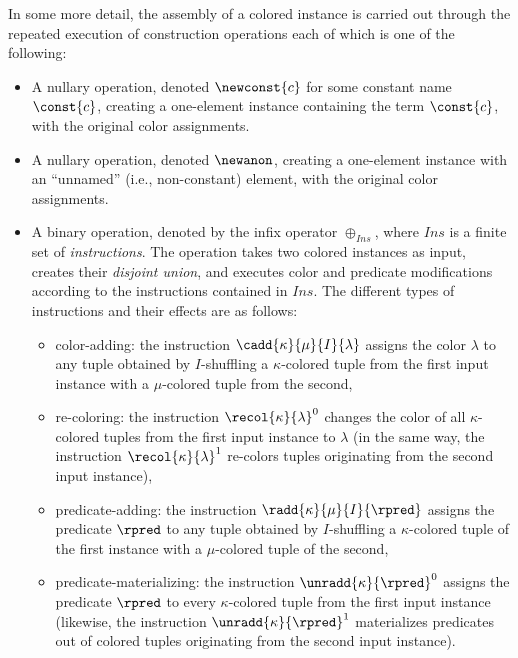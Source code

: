In some more detail, the assembly of a colored instance is carried out through the repeated execution of construction operations each of which is one of the following:
\begin{itemize}
	\item A nullary operation, denoted $\newconst{c}$ for some constant name $\const{c}$, creating a one-element instance containing the term $\const{c}$, with the original color assignments.
	\item A nullary operation, denoted $\newanon$,  creating a one-element instance with an ``unnamed'' (i.e., non-constant) element, with the original color assignments.
	\item A binary operation, denoted by the infix operator $\oplus_{\mathit{Ins}}$, where $\mathit{Ins}$ is a finite set of \emph{instructions}.
	The operation takes two colored instances as input, creates their \emph{disjoint union}, and executes color and predicate modifications according to the instructions contained in $\mathit{Ins}$. The different types of instructions and their effects are as follows:
	\begin{itemize}
		\item color-adding: the instruction $\cadd{\kappa}{\mu}{I}{\lambda}$ assigns the color $\lambda$ to any tuple obtained by $I$-shuffling a $\kappa$-colored tuple from the first input instance with a $\mu$-colored tuple from the second,   
		\item re-coloring: the instruction $\recol{\kappa}{\lambda}^0$ changes the color of all $\kappa$-colored tuples from the first input instance to $\lambda$ (in the same way, the instruction $\recol{\kappa}{\lambda}^1$ re-colors tuples originating from the second input instance),		
		\item predicate-adding: the instruction $\radd{\kappa}{\mu}{I}{\rpred}$ assigns the predicate $\rpred$ to any tuple obtained by $I$-shuffling a $\kappa$-colored tuple of the first instance with a $\mu$-colored tuple of the second,
		\item predicate-materializing: the instruction $\unradd{\kappa}{\rpred}^0$ assigns the predicate $\rpred$ to every $\kappa$-colored tuple from the first input instance (likewise, the instruction $\unradd{\kappa}{\rpred}^1$ materializes predicates out of colored tuples originating from the second input instance).         
	\end{itemize}
	\end{itemize}



